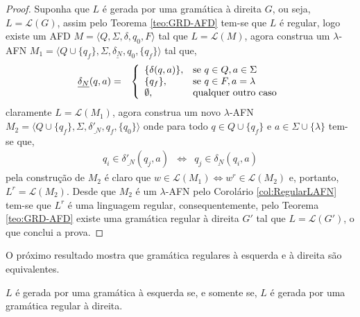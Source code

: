\begin{proof}
	Suponha que $L$ é gerada por uma gramática à direita $G$, ou seja, $L = \mathcal{L}(G)$, assim pelo Teorema \ref{teo:GRD-AFD} tem-se que $L$ é regular, logo existe um AFD $M = \langle Q, \Sigma, \delta, q_0, F\rangle$ tal que $L = \mathcal{L}(M)$, agora construa um $\lambda$-AFN $M_1 = \langle Q \cup \{q_f\}, \Sigma, \underline{\delta_N}, q_0, \{q_f\}\rangle$ tal que,
	\begin{eqnarray*}
		\underline{\delta_N}(q, a) & = & \left\{\begin{array}{ll}	
			\{\delta(q, a)\}, & \hbox{se } q \in Q, a \in \Sigma\\
			\{q_f\}, & \hbox{se } q \in F, a = \lambda \\
			\emptyset, & \hbox{qualquer outro caso}
		\end{array}\right.
	\end{eqnarray*}
	claramente $L = \mathcal{L}(M_1)$, agora construa um novo $\lambda$-AFN $M_2 = \langle Q \cup \{q_f\}, \Sigma, \underline{\delta'_N}, q_f, \{q_0\}\rangle$ onde para todo $q \in Q \cup \{q_f\}$ e $a \in \Sigma \cup \{\lambda\}$ tem-se que,
	\begin{eqnarray*}
		q_i \in \underline{\delta'_N}(q_j, a) & \Longleftrightarrow & q_j \in \underline{\delta_N}(q_i, a)
	\end{eqnarray*}
	pela construção de $M_2$ é claro que  $w \in \mathcal{L}(M_1) \Longleftrightarrow w^r \in \mathcal{L}(M_2)$ e, portanto, $L^r = \mathcal{L}(M_2)$. Desde que $M_2$ é um $\lambda$-AFN pelo Corolário \ref{col:RegularLAFN} tem-se que $L^r$ é uma linguagem regular, consequentemente, pelo Teorema \ref{teo:GRD-AFD} existe uma gramática regular à direita $G'$ tal que $L = \mathcal{L}(G')$, o que conclui a prova.
\end{proof}

O próximo resultado mostra que gramática regulares à esquerda e à direita são equivalentes.

\begin{theorem}\label{teo:MudacaDeLadoGramatica}
	$L$ é gerada por uma gramática à esquerda se, e somente se, $L$ é gerada por uma gramática regular à direita.
\end{theorem}

